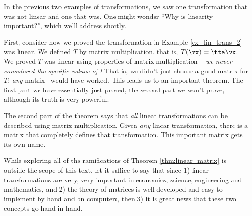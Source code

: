 \medskip


In the previous two examples of transformations, we saw one transformation that was not linear and one that was. One might wonder ``Why is linearity important?'', which we'll address shortly.

First, consider how we proved the transformation in Example \ref{ex_lin_trans_2} was linear. We defined $T$ by matrix multiplication, that is, $T(\vx) = \tta\vx$. We proved $T$ was linear using properties of matrix multiplication -- \textit{we never considered the specific values of \tta!} That is, we didn't just choose a good matrix for $T$; \textit{any} matrix \tta\ would have worked. This leads us to an important theorem. The first part we have essentially just proved; the second part we won't prove, although its truth is very powerful.

\smallskip


\smallskip

The second part of the theorem says that \textit{all} linear transformations can be described using matrix multiplication. Given \textit{any} linear transformation, there is a matrix that completely defines that transformation. This important matrix gets its own name.



\smallskip

While exploring all of the ramifications of Theorem \ref{thm:linear_matrix} is outside the scope of this text, let it suffice to say that since 1) linear transformations are very, very important in economics, science, engineering and mathematics, and 2) the theory of matrices is well developed and easy to implement by hand and on computers, then 3) it is great news that these two concepts go hand in hand.

